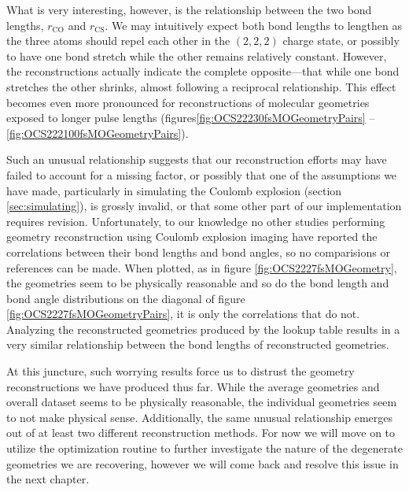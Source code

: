 What is very interesting, however, is the relationship between the two bond lengths, $r_\mathrm{CO}$ and $r_\mathrm{CS}$. We may intuitively expect both bond lengths to lengthen as the three atoms should repel each other in the $(2,2,2)$ charge state, or possibly to have one bond stretch while the other remains relatively constant. However, the reconstructions actually indicate the complete opposite---that while one bond stretches the other shrinks, almost following a reciprocal relationship. This effect becomes even more pronounced for reconstructions of molecular geometries exposed to longer pulse lengths (figures\ref{fig:OCS22230fsMOGeometryPairs} -- \ref{fig:OCS222100fsMOGeometryPairs}).

Such an unusual relationship suggests that our reconstruction efforts may have failed to account for a missing factor, or possibly that one of the assumptions we have made, particularly in simulating the Coulomb explosion (section \ref{sec:simulating}), is grossly invalid, or that some other part of our implementation requires revision. Unfortunately, to our knowledge no other studies performing geometry reconstruction using Coulomb explosion imaging have reported the correlations between their bond lengths and bond angles, so no comparisions or references can be made. When plotted, as in figure \ref{fig:OCS2227fsMOGeometry}, the geometries seem to be physically reasonable and so do the bond length and bond angle distributions on the diagonal of figure \ref{fig:OCS2227fsMOGeometryPairs}, it is only the correlations that do not. Analyzing the reconstructed geometries produced by the lookup table results in a very similar relationship between the bond lengths of reconstructed geometries.


At this juncture, such worrying results force us to distrust the geometry reconstructions we have produced thus far. While the average geometries and overall dataset seems to be physically reasonable, the individual geometries seem to not make physical sense. Additionally, the same unusual relationship emerges out of at least two different reconstruction methods. For now we will move on to utilize the optimization routine to further investigate the nature of the degenerate geometries we are recovering, however we will come back and resolve this issue in the next chapter.

